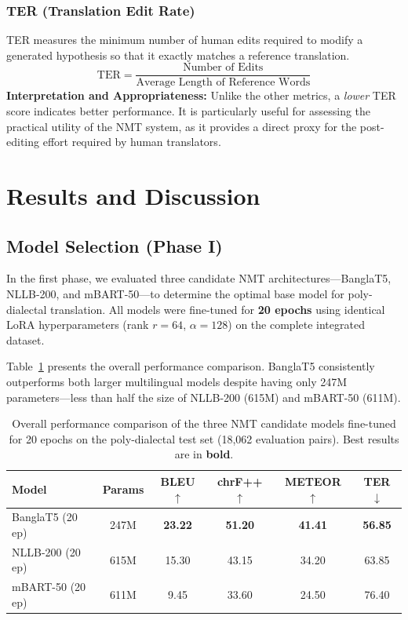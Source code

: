 \documentclass[12pt,a4paper]{article}
\begin{document}
\subsubsection{TER (Translation Edit Rate)}
TER \cite{snover2006study} measures the minimum number of human edits required to modify a generated hypothesis so that it exactly matches a reference translation.
\begin{equation}
\text{TER} = \frac{\text{Number of Edits}}{\text{Average Length of Reference Words}}
\end{equation}
\textbf{Interpretation and Appropriateness:} Unlike the other metrics, a \textit{lower} TER score indicates better performance. It is particularly useful for assessing the practical utility of the NMT system, as it provides a direct proxy for the post-editing effort required by human translators.

\newpage

\section{Results and Discussion}

\subsection{Model Selection (Phase I)}
In the first phase, we evaluated three candidate NMT architectures---BanglaT5, NLLB-200, and mBART-50---to determine the optimal base model for poly-dialectal translation. All models were fine-tuned for \textbf{20 epochs} using identical LoRA hyperparameters (rank $r=64$, $\alpha=128$) on the complete integrated dataset.

Table~\ref{tab:model_results_search} presents the overall performance comparison. BanglaT5 consistently outperforms both larger multilingual models despite having only 247M parameters---less than half the size of NLLB-200 (615M) and mBART-50 (611M).

\begin{table}[htbp]
\centering
\caption{Overall performance comparison of the three NMT candidate models fine-tuned for 20 epochs on the poly-dialectal test set (18,062 evaluation pairs). Best results are in \textbf{bold}.}
\label{tab:model_results_search}
\begin{tabular}{l c c c c c}
\toprule
\textbf{Model} & \textbf{Params} & \textbf{BLEU $\uparrow$} & \textbf{chrF++ $\uparrow$} & \textbf{METEOR $\uparrow$} & \textbf{TER $\downarrow$} \\
\midrule
BanglaT5 (20 ep) & 247M & \textbf{23.22} & \textbf{51.20} & \textbf{41.41} & \textbf{56.85} \\
NLLB-200 (20 ep) & 615M & 15.30 & 43.15 & 34.20 & 63.85 \\
mBART-50 (20 ep) & 611M &  9.45 & 33.60 & 24.50 & 76.40 \\
\bottomrule
\end{tabular}
\end{table}
\end{document}
